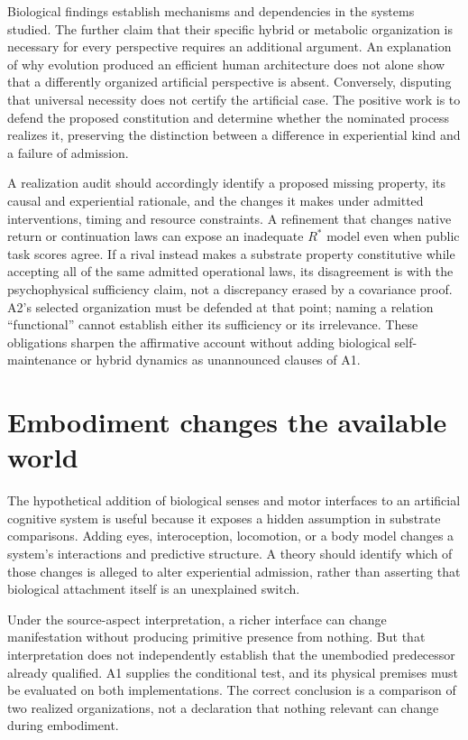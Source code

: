 Biological findings establish mechanisms and dependencies in the systems studied. The further claim that their specific hybrid or metabolic organization is necessary for every perspective requires an additional argument. An explanation of why evolution produced an efficient human architecture does not alone show that a differently organized artificial perspective is absent. Conversely, disputing that universal necessity does not certify the artificial case. The positive work is to defend the proposed constitution and determine whether the nominated process realizes it, preserving the distinction between a difference in experiential kind and a failure of admission.

A realization audit should accordingly identify a proposed missing property, its causal and experiential rationale, and the changes it makes under admitted interventions, timing and resource constraints. A refinement that changes native return or continuation laws can expose an inadequate $R^\ast$ model even when public task scores agree. If a rival instead makes a substrate property constitutive while accepting all of the same admitted operational laws, its disagreement is with the psychophysical sufficiency claim, not a discrepancy erased by a covariance proof. A2's selected organization must be defended at that point; naming a relation ``functional'' cannot establish either its sufficiency or its irrelevance. These obligations sharpen the affirmative account without adding biological self-maintenance or hybrid dynamics as unannounced clauses of A1.

\section{Embodiment changes the available world}\label{section:ai:embodiment-changes-the-available-world}
The hypothetical addition of biological senses and motor interfaces to an artificial cognitive system is useful because it exposes a hidden assumption in substrate comparisons. Adding eyes, interoception, locomotion, or a body model changes a system's interactions and predictive structure. A theory should identify which of those changes is alleged to alter experiential admission, rather than asserting that biological attachment itself is an unexplained switch.

Under the source-aspect interpretation, a richer interface can change manifestation without producing primitive presence from nothing. But that interpretation does not independently establish that the unembodied predecessor already qualified. A1 supplies the conditional test, and its physical premises must be evaluated on both implementations. The correct conclusion is a comparison of two realized organizations, not a declaration that nothing relevant can change during embodiment.

